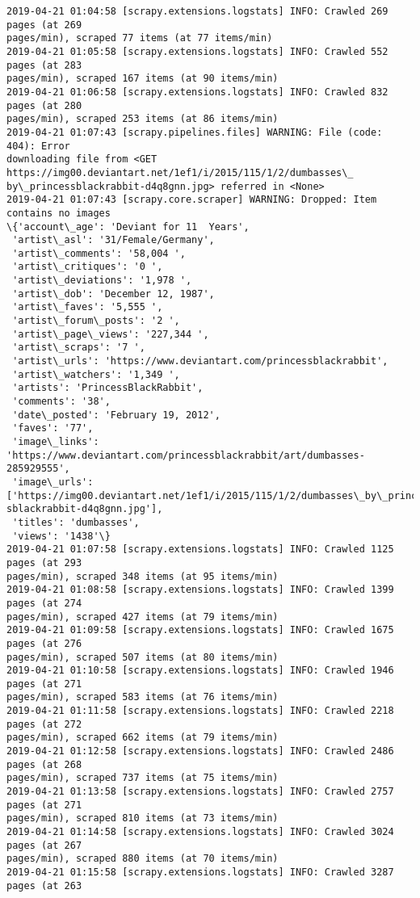 \documentclass[11pt]{article}
\begin{document}
\begin{Verbatim}[commandchars=\\\{\},fontsize=\footnotesize]
2019-04-21 01:04:58 [scrapy.extensions.logstats] INFO: Crawled 269 pages (at 269
pages/min), scraped 77 items (at 77 items/min)
2019-04-21 01:05:58 [scrapy.extensions.logstats] INFO: Crawled 552 pages (at 283
pages/min), scraped 167 items (at 90 items/min)
2019-04-21 01:06:58 [scrapy.extensions.logstats] INFO: Crawled 832 pages (at 280
pages/min), scraped 253 items (at 86 items/min)
2019-04-21 01:07:43 [scrapy.pipelines.files] WARNING: File (code: 404): Error
downloading file from <GET https://img00.deviantart.net/1ef1/i/2015/115/1/2/dumbasses\_
by\_princessblackrabbit-d4q8gnn.jpg> referred in <None>
2019-04-21 01:07:43 [scrapy.core.scraper] WARNING: Dropped: Item contains no images
\{'account\_age': 'Deviant for 11  Years',
 'artist\_asl': '31/Female/Germany',
 'artist\_comments': '58,004 ',
 'artist\_critiques': '0 ',
 'artist\_deviations': '1,978 ',
 'artist\_dob': 'December 12, 1987',
 'artist\_faves': '5,555 ',
 'artist\_forum\_posts': '2 ',
 'artist\_page\_views': '227,344 ',
 'artist\_scraps': '7 ',
 'artist\_urls': 'https://www.deviantart.com/princessblackrabbit',
 'artist\_watchers': '1,349 ',
 'artists': 'PrincessBlackRabbit',
 'comments': '38',
 'date\_posted': 'February 19, 2012',
 'faves': '77',
 'image\_links':
'https://www.deviantart.com/princessblackrabbit/art/dumbasses-285929555',
 'image\_urls': ['https://img00.deviantart.net/1ef1/i/2015/115/1/2/dumbasses\_by\_princes
sblackrabbit-d4q8gnn.jpg'],
 'titles': 'dumbasses',
 'views': '1438'\}
2019-04-21 01:07:58 [scrapy.extensions.logstats] INFO: Crawled 1125 pages (at 293
pages/min), scraped 348 items (at 95 items/min)
2019-04-21 01:08:58 [scrapy.extensions.logstats] INFO: Crawled 1399 pages (at 274
pages/min), scraped 427 items (at 79 items/min)
2019-04-21 01:09:58 [scrapy.extensions.logstats] INFO: Crawled 1675 pages (at 276
pages/min), scraped 507 items (at 80 items/min)
2019-04-21 01:10:58 [scrapy.extensions.logstats] INFO: Crawled 1946 pages (at 271
pages/min), scraped 583 items (at 76 items/min)
2019-04-21 01:11:58 [scrapy.extensions.logstats] INFO: Crawled 2218 pages (at 272
pages/min), scraped 662 items (at 79 items/min)
2019-04-21 01:12:58 [scrapy.extensions.logstats] INFO: Crawled 2486 pages (at 268
pages/min), scraped 737 items (at 75 items/min)
2019-04-21 01:13:58 [scrapy.extensions.logstats] INFO: Crawled 2757 pages (at 271
pages/min), scraped 810 items (at 73 items/min)
2019-04-21 01:14:58 [scrapy.extensions.logstats] INFO: Crawled 3024 pages (at 267
pages/min), scraped 880 items (at 70 items/min)
2019-04-21 01:15:58 [scrapy.extensions.logstats] INFO: Crawled 3287 pages (at 263

\end{Verbatim}
\end{document}
